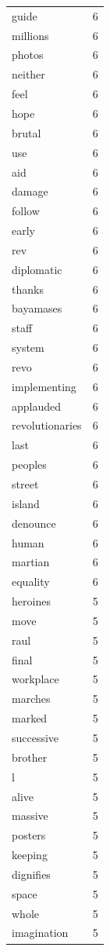\begin{tabular}{lr}
guide & 6 \\
millions & 6 \\
photos & 6 \\
neither & 6 \\
feel & 6 \\
hope & 6 \\
brutal & 6 \\
use & 6 \\
aid & 6 \\
damage & 6 \\
follow & 6 \\
early & 6 \\
rev & 6 \\
diplomatic & 6 \\
thanks & 6 \\
bayamases & 6 \\
staff & 6 \\
system & 6 \\
revo & 6 \\
implementing & 6 \\
applauded & 6 \\
revolutionaries & 6 \\
last & 6 \\
peoples & 6 \\
street & 6 \\
island & 6 \\
denounce & 6 \\
human & 6 \\
martian & 6 \\
equality & 6 \\
heroines & 5 \\
move & 5 \\
raul & 5 \\
final & 5 \\
workplace & 5 \\
marches & 5 \\
marked & 5 \\
successive & 5 \\
brother & 5 \\
l & 5 \\
alive & 5 \\
massive & 5 \\
posters & 5 \\
keeping & 5 \\
dignifies & 5 \\
space & 5 \\
whole & 5 \\
imagination & 5 \\

\end{tabular}
